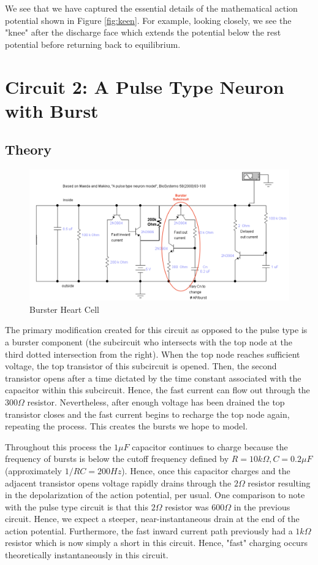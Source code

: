 \documentclass[12]{book}
\newcommand\0{\mathbf{0}}
\newcommand\<{\langle}
\renewcommand\>{\rangle}
\begin{document}
We see that we have captured the essential details of the mathematical action potential shown in Figure \ref{fig:keen}. For example, looking closely, we see the "knee" after the discharge face which extends the potential below the rest potential before returning back to equilibrium. 

\section{Circuit 2: A Pulse Type Neuron with Burst}

\subsection{Theory}

\begin{figure}[h]
\centering
\includegraphics[width=\textwidth]{burster_heart_cell}	
\caption{Burster Heart Cell}
\end{figure}

The primary modification created for this circuit as opposed to the pulse type is a burster component (the subcircuit who intersects with the top node at the third dotted intersection from the right). When the top node reaches sufficient voltage, the top transistor of this subcircuit is opened. Then, the second transistor opens after a time dictated by the time constant associated with the capacitor within this subcircuit. Hence, the fast current can flow out through the $300 \Omega$ resistor. Nevertheless, after enough voltage has been drained the top transistor closes and the fast current begins to recharge the top node again, repeating the process. This creates the bursts we hope to model.

Throughout this process the $1 \mu F$ capacitor continues to charge because the frequency of bursts is below the cutoff frequency defined by $R = 10k \Omega, C = 0.2 \mu F$ (approximately $1/RC = 200 Hz$). Hence, once this capacitor charges and the adjacent transistor opens voltage rapidly drains through the $2 \Omega$ resistor resulting in the depolarization of the action potential, per usual. One comparison to note with the pulse type circuit is that this $2 \Omega$ resistor was $600 \Omega$ in the previous circuit. Hence, we expect a steeper, near-instantaneous drain at the end of the action potential. Furthermore, the fast inward current path previously had a $1k \Omega$ resistor which is now simply a short in this circuit. Hence, "fast" charging occurs theoretically instantaneously in this circuit.
\end{document}
